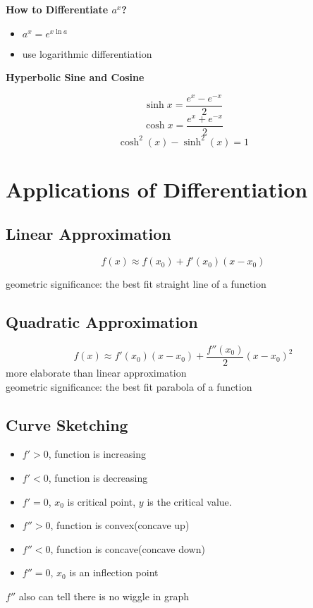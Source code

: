 \documentclass{article}
\begin{document}
\textbf{How to Differentiate $a^x$?}

\begin{itemize}
  \item $a^x = e^{x\ln a}$
  \item use logarithmic differentiation
\end{itemize}

\textbf{Hyperbolic Sine and Cosine}

$$\sinh x = \frac{e^x - e^{-x}}{2}$$
$$\cosh x = \frac{e^x + e^{-x}}{2}$$
$$\cosh ^2(x) - \sinh ^2(x) = 1$$

\section{Applications of Differentiation}
\subsection{Linear Approximation}

$$f(x) \approx f(x_0) + f'(x_0)(x-x_0)$$

geometric significance: the best fit straight line of a function

\subsection{Quadratic Approximation}
$$f(x) \approx f'(x_0)(x-x_0) + \frac{f''(x_0)}{2}(x-x_0)^2$$
more elaborate than linear approximation \\
geometric significance: the best fit parabola of a function

\subsection{Curve Sketching}
\begin{itemize}
  \item $f' > 0$, function is increasing
  \item $f' < 0$, function is decreasing
  \item $f' = 0$, $x_0$ is critical point, $y$ is the critical value.
  \item $f'' > 0$, function is convex(concave up)
  \item $f'' < 0$, function is concave(concave down)
  \item $f'' = 0$, $x_0$ is an inflection point
\end{itemize}

$f''$ also can tell there is no wiggle in graph
\end{document}
